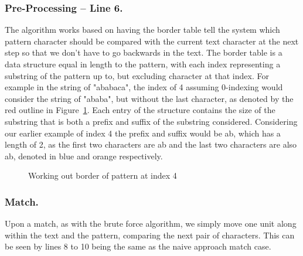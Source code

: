 \subsubsection{Pre-Processing -- Line 6.}
The algorithm works based on having the border table tell the system which pattern character should be compared with the current text character at the next step so that we don't have to go backwards in the text. The border table is a data structure equal in length to the pattern, with each index representing a substring of the pattern up to, but excluding character at that index. For example in the string of "ababaca", the index of 4 assuming 0-indexing would consider the string of "ababa", but without the last character, as denoted by the red outline in Figure~\ref{fig:kmp-pre-process}. Each entry of the structure contains the size of the substring that is both a prefix and suffix of the substring considered. Considering our earlier example of index 4 the prefix and suffix would be ab, which has a length of 2, as the first two characters are ab and the last two characters are also ab, denoted in blue and orange respectively.

\begin{figure}[htp]
  \centering
  \caption{Working out border of pattern at index 4}
  \label{fig:kmp-pre-process}
\end{figure}



\subsubsection{Match.}
Upon a match, as with the brute force algorithm, we simply move one unit along within the text and the pattern, comparing the next pair of characters. This can be seen by lines 8 to 10 being the same as the naive approach match case.

